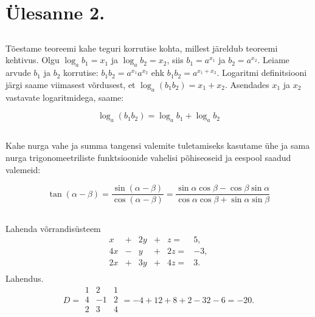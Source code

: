 \section{Ülesanne 2.}

\subsection{}

Tõestame teoreemi kahe teguri korrutise kohta, millest järeldub teoreemi kehtivus.
Olgu $\log_a b_1 = x_1$ ja $\log_a b_2 = x_2$, siis $b_1 = a^{x_1}$ ja $b_2 = a^{x_2}$. Leiame arvude $b_1$ ja $b_2$ korrutise: $b_1 b_2 = a^{x_1} a^{x_2}$ ehk $b_1 b_2 = a^{x_1 + x_2}$. Logaritmi definitsiooni järgi saame viimasest võrdusest, et $\log_a(b_1 b_2) = x_1 + x_2$. Asendades $x_1$ ja $x_2$ vastavate logaritmidega, saame:

\begin{equation}
	\log_a(b_1 b_2) = \log_a b_1 + \log_a b_2
\end{equation}

\subsection{}

Kahe nurga vahe ja summa tangensi valemite tuletamiseks kasutame ühe ja sama nurga trigonomeetriliste funktsioonide vahelisi põhiseoseid ja eespool saadud valemeid:

\begin{equation}
	\tan(\alpha	- \beta)
		= \frac{\sin(\alpha	- \beta)}{\cos(\alpha	- \beta)}
		= \frac{\sin\alpha\cos\beta - \cos\beta\sin\alpha}
					 {\cos\alpha\cos\beta + \sin\alpha\sin\beta}
\end{equation}

\subsection{}

Lahenda võrrandisüsteem
\begin{equation}
  \begin{array}{*{7}{r}}
    x  & + & 2y & + &  z = &  5, \\
    4x & - &  y & + & 2z = & -3, \\
    2x & + & 3y & + & 4z = &  3. \\
  \end{array}
\end{equation}
Lahendus.
\begin{equation}
	D = 
	\begin{array}{|*{3}{r}|}
	1 & 2 & 1 \\
	4 & -1 & 2 \\
	2 & 3 & 4 \\
	\end{array}
	= -4 +12 +8 +2 -32 -6 = -20.
\end{equation}
